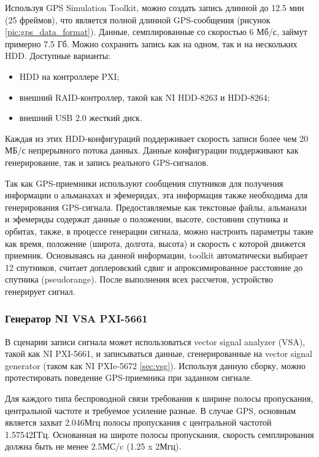 Используя GPS Simulation Toolkit, можно создать запись длинной до 12.5 мин (25 фреймов), что является полной длинной
GPS-сообщения \cite{yacenkov, tsui} (рисунок \ref{pic:gps_data_format}). Данные, семплированные со скоростью 6 Мб/с,
займут примерно 7.5 Гб. Можно сохранить запись как на одном, так и на нескольких HDD. Доступные варианты:
\begin{itemize}
\item HDD на контроллере PXI;
\item внешний RAID-контроллер, такой как NI HDD-8263 и HDD-8264;
\item внешний USB 2.0 жесткий диск.
\end{itemize}

Каждая из этих HDD-конфигураций поддерживает скорость записи более чем 20 МБ/с непрерывного потока данных.
Данные конфигурации поддерживают как генерирование, так и запись реального GPS-сигналов.

Так как GPS-приемники используют сообщения спутников для получения информации о альманахах и эфемеридах, эта информация
также необходима для генерирования GPS-сигнала. Предоставляемые как текстовые файлы, альманахи и эфемериды содержат
данные о положении, высоте, состоянии спутника и орбитах, также, в процессе генерации сигнала, можно настроить параметры
такие как время, положение (широта, долгота, высота) и скорость с которой движется приемник. Основываясь на данной
информации, toolkit автоматически выбирает 12 спутников, считает доплеровский сдвиг и апроксимированное расстояние до
спутника (pseudorange). После выполнения всех рассчетов, устройство генерирует сигнал.

\subsubsection*{Генератор NI VSA PXI-5661}
В сценарии записи сигнала может использоваться vector signal analyzer (VSA), такой как NI PXI-5661, и записываться данные,
сгенерированные на vector signal generator (таком как NI PXIe-5672 \ref{sec:vsg}). Используя данную сборку, можно
протестировать поведение GPS-приемника при заданном сигнале.

Для каждого типа беспроводной связи требования к ширине полосы пропускания, центральной частоте и требуемое усиление разные.
В случае GPS, основным является захват 2.046Мгц полосы пропускания с центральной частотой 1.57542ГГц. Основанная на
широте полосы пропускания, скорость семплирования должна быть не менее 2.5МС/c (1.25 x 2Мгц). 


